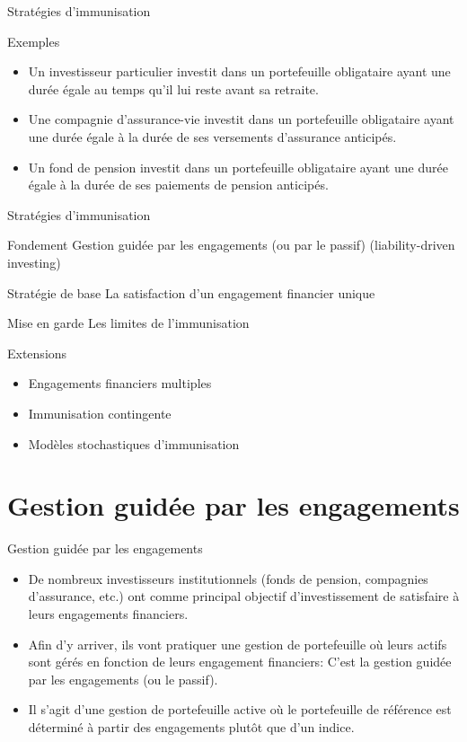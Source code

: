 \documentclass[10pt,a4paper]{beamer}
\begin{document}
\begin{frame}{Stratégies d’immunisation}
\begin{block}{Exemples}
\begin{itemize}[label=\bullet]
\item Un investisseur particulier investit dans un portefeuille obligataire ayant une durée égale au temps qu’il lui reste avant sa retraite.  
\item Une compagnie d’assurance-vie investit dans un portefeuille obligataire ayant une durée égale à la durée de ses versements d’assurance anticipés.  
\item Un fond de pension investit dans un portefeuille obligataire ayant une durée égale à la durée de ses paiements de pension anticipés.
\end{itemize}
\end{block}
\end{frame}

\begin{frame}{Stratégies d’immunisation}
\begin{block}{Fondement}
Gestion guidée par les engagements (ou par le passif) (liability-driven investing)
\end{block}
\begin{block}{Stratégie de base}
La satisfaction d’un engagement financier unique
\end{block}
\begin{block}{Mise en garde}
Les limites de l’immunisation
\end{block}
\begin{block}{Extensions}
\begin{itemize}[label=\bullet]
\item Engagements financiers multiples
\item Immunisation contingente
\item Modèles stochastiques d’immunisation
\end{itemize}
\end{block}
\end{frame}

\section{Gestion guidée par les engagements}

\begin{frame}{Gestion guidée par les engagements}
\begin{itemize}[label=\bullet]
\item De nombreux investisseurs institutionnels (fonds de pension, compagnies d’assurance, etc.) ont comme principal objectif d’investissement de satisfaire à leurs engagements financiers.  
\item Afin d’y arriver, ils vont pratiquer une gestion de portefeuille où leurs actifs sont gérés en fonction de leurs engagement financiers: C’est la gestion guidée par les engagements (ou le passif).
\item Il s’agit d’une gestion de portefeuille active où le portefeuille de référence est déterminé à partir des engagements plutôt que d’un indice.
\end{itemize}
\end{frame}
\end{document}
